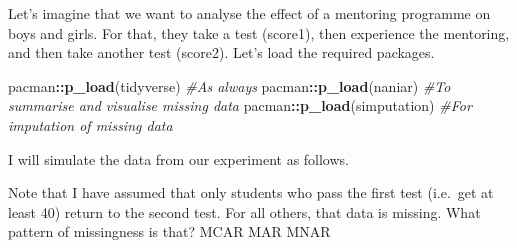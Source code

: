 \documentclass[
]{book}
\newenvironment{Shaded}{\begin{snugshade}}{\end{snugshade}}
\newcommand{\CommentTok}[1]{\textcolor[rgb]{0.56,0.35,0.01}{\textit{#1}}}
\newcommand{\DataTypeTok}[1]{\textcolor[rgb]{0.13,0.29,0.53}{#1}}
\newcommand{\DecValTok}[1]{\textcolor[rgb]{0.00,0.00,0.81}{#1}}
\newcommand{\KeywordTok}[1]{\textcolor[rgb]{0.13,0.29,0.53}{\textbf{#1}}}
\newcommand{\NormalTok}[1]{#1}
\newcommand{\OperatorTok}[1]{\textcolor[rgb]{0.81,0.36,0.00}{\textbf{#1}}}
\newcommand{\OtherTok}[1]{\textcolor[rgb]{0.56,0.35,0.01}{#1}}
\newcommand{\StringTok}[1]{\textcolor[rgb]{0.31,0.60,0.02}{#1}}
\begin{document}
Let's imagine that we want to analyse the effect of a mentoring programme on boys and girls. For that, they take a test (score1), then experience the mentoring, and then take another test (score2). Let's load the required packages.

\begin{Shaded}
\begin{Highlighting}[]
\NormalTok{pacman}\OperatorTok{::}\KeywordTok{p_load}\NormalTok{(tidyverse) }\CommentTok{#As always}
\NormalTok{pacman}\OperatorTok{::}\KeywordTok{p_load}\NormalTok{(naniar) }\CommentTok{#To summarise and visualise missing data}
\NormalTok{pacman}\OperatorTok{::}\KeywordTok{p_load}\NormalTok{(simputation) }\CommentTok{#For imputation of missing data}
\end{Highlighting}
\end{Shaded}

I will simulate the data from our experiment as follows.

\begin{Shaded}
\end{Shaded}

Note that I have assumed that only students who pass the first test (i.e.~get at least 40) return to the second test. For all others, that data is missing. What pattern of missingness is that? MCAR MAR MNAR
\end{document}
